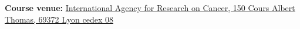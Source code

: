 \documentclass[a4paper,twoside,12pt]{book}
\begin{document}
\noindent
\large
\textbf{Course venue:}
\href{http://www.iarc.fr/en/about/directions-iarc.php}{International Agency for Research on Cancer, 150 Cours Albert Thomas, 69372 Lyon cedex 08}\\[1em]

\vfill
\end{document}

